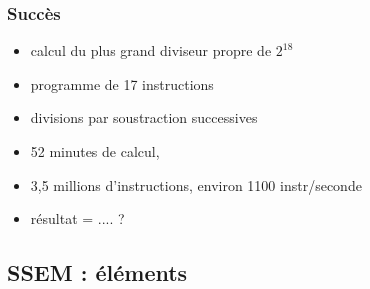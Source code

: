 \documentclass{beamer}
\begin{document}
\begin{frame}
\frametitle{Succès}
\begin{itemize}
\item calcul du plus grand diviseur propre de $2^{18}$ 
\item programme de 17 instructions
\item divisions par soustraction successives
\item 52 minutes de calcul, 
\item 3,5 millions d'instructions, environ 1100 instr/seconde
\item résultat = .... ?
\end{itemize}
\end{frame}

\subsection{SSEM : éléments}
\end{document}
